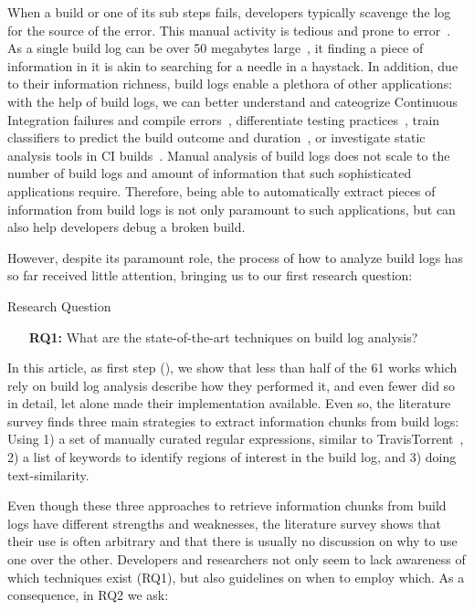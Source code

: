 When a build or one of its sub steps fails, developers typically
scavenge the log for the source of the error.
This manual activity is
tedious and prone to error~\cite{santolucito2018statically}.
As a
single build log can be over 50 megabytes large~\cite{beller2017oops},
it finding a piece of information in it is akin to searching for a
needle in a haystack.
In addition, due to their information richness,
build logs enable a plethora of other applications: with the help of
build logs, we can better understand and cateogrize Continuous
Integration failures and compile
errors~\cite{islam2017insights,seo2014programmers}, differentiate
testing practices~\cite{orellana2017differences,vassallo2017a-tale},
train classifiers to predict the build outcome and
duration~\cite{ni2017cost,bisong2017built,machalica2019predictive}, or
investigate static analysis tools in CI
builds~\cite{zampetti2017open}.
Manual analysis of build logs does not
scale to the number of build logs and amount of information that such
sophisticated applications require.
Therefore, being able to
automatically extract pieces of information from build logs
is not only paramount to such applications, but can also help
developers debug a broken build.

However, despite its paramount role, the process of how to analyze
build logs has so far received little attention, bringing us to our
first research question:
\begin{simplebox}[minipage boxed title*=-5cm]{Research Question}

\begin{itemize}
  \item[\textbf{RQ1:}] What are the state-of-the-art techniques on build
  log analysis?
 \end{itemize}
\end{simplebox}

In this article, as first step (), we show that
less than half of the 61 works which rely on build log analysis
describe how they performed it, and even fewer did so in detail, let
alone made their implementation available.
Even so, the literature
survey finds three main strategies to extract information chunks from
build logs: Using 1) a set of manually curated regular expressions,
similar to TravisTorrent~\cite{beller2017oops}, 2) a list of keywords
to identify regions of interest in the build log, and 3)
doing text-similarity.

Even though these three approaches to retrieve information chunks from
build logs have different strengths and weaknesses, the literature
survey shows that their use is often arbitrary and that there is
usually no discussion on why to use one over the other.
Developers and
researchers not only seem to lack awareness of which techniques exist
(RQ1), but also guidelines on when to employ which.
As a consequence,
in RQ2 we ask:

